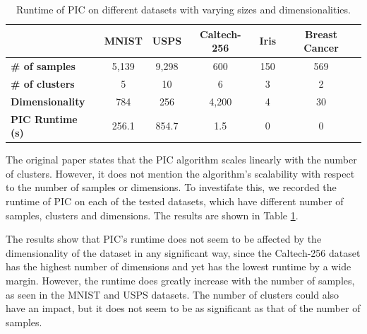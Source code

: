 \begin{table}[h]
    \centering
    \begin{tabular}{|l|c|c|c|c|c|}
    \hline
     & \textbf{MNIST} & \textbf{USPS} & \textbf{Caltech-256} & \textbf{Iris} & \textbf{Breast Cancer} \\
    \hline
    \textbf{\# of samples} & 5,139 & 9,298 & 600 & 150 & 569 \\ \hline
    \textbf{\# of clusters} & 5 & 10 & 6 & 3 & 2 \\ \hline
    \textbf{Dimensionality} & 784 & 256 & 4,200 & 4 & 30 \\ \hline
    \textbf{PIC Runtime (s)} & 256.1 & 854.7 & 1.5 & 0 & 0 \\ \hline
    \end{tabular}
    \caption{Runtime of PIC on different datasets with varying sizes and dimensionalities.}
    \label{table:time}
\end{table}

The original paper states that the PIC algorithm scales linearly with the number of clusters. However, it does not mention the algorithm's scalability with respect to the number of samples or dimensions. To investifate this, we recorded the runtime of PIC on each of the tested datasets, which have different number of samples, clusters and dimensions. The results are shown in Table \ref{table:time}.

The results show that PIC's runtime does not seem to be affected by the dimensionality of the dataset in any significant way, since the Caltech-256 dataset has the highest number of dimensions and yet has the lowest runtime by a wide margin. However, the runtime does greatly increase with the number of samples, as seen in the MNIST and USPS datasets. The number of clusters could also have an impact, but it does not seem to be as significant as that of the number of samples.
